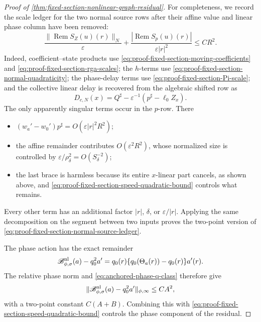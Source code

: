 \begin{proof}[Proof of
\cref{thm:fixed-section-nonlinear-graph-residual}]
For completeness, we record the scale ledger for the two normal source
rows after their affine value and linear phase column have been removed:
\begin{equation}
 \frac{\|\operatorname{Rem}S_Z(u)(r)\|_N}{\varepsilon}
 +\frac{|\operatorname{Rem}S_p(u)(r)|}
             {\varepsilon|r|^2}
 \le CR^2.                                       \label{eq:proof-fixed-section-normal-source-ledger}
\end{equation}
Indeed, coefficient--state products use
\cref{eq:proof-fixed-section-moving-coefficients} and
\cref{eq:proof-fixed-section-rga-scales}; the \(h\)-terms use
\cref{eq:proof-fixed-section-normal-quadraticity}; the phase-delay terms
use \cref{eq:proof-fixed-section-Pi-scale}; and the collective linear
delay is recovered from the algebraic shifted row as
\[
 D_{c,N}(x)=Q^\sharp-\varepsilon^{-1}
                   (p^\sharp-\ell_0Z_x).
\]
The only apparently singular terms occur in the \(p\)-row.  There
\begin{itemize}
\item
\((w_a'-w_0')p^\sharp=O(\varepsilon|r|^2R^2)\);
\item
the affine remainder contributes
\(O(\varepsilon^2R^2)\), whose normalized size is controlled by
\(\varepsilon/\rho_\delta^2=O(S_\delta^{-2})\);
\item
the last brace is harmless because its entire \(x\)-linear part cancels,
as shown above, and
\cref{eq:proof-fixed-section-speed-quadratic-bound} controls what remains.
\end{itemize}
Every other term has an additional factor \(|r|\), \(\delta\), or
\(\varepsilon/|r|\).  Applying the same decomposition on the segment
between two inputs proves the two-point version of
\cref{eq:proof-fixed-section-normal-source-ledger}.

The phase action has the exact remainder
\[
 \mathscr B_{\phi,\sigma}^{\rm nl}(a)-q_0^2a'
 =q_0(r)\{q_0(\Theta_a(r))-q_0(r)\}a'(r).
\]
The relative phase norm and
\cref{eq:anchored-phase-q-class} therefore give
\begin{equation}
 \|\mathscr B_{\phi,\sigma}^{\rm nl}(a)-q_0^2a'\|_{\phi,\infty}
 \le CA^2,                                       \label{eq:proof-fixed-section-phase-action-remainder}
\end{equation}
with a two-point constant \(C(A+B)\).  Combining this with
\cref{eq:proof-fixed-section-speed-quadratic-bound} controls the phase
component of the residual.


\end{proof}
